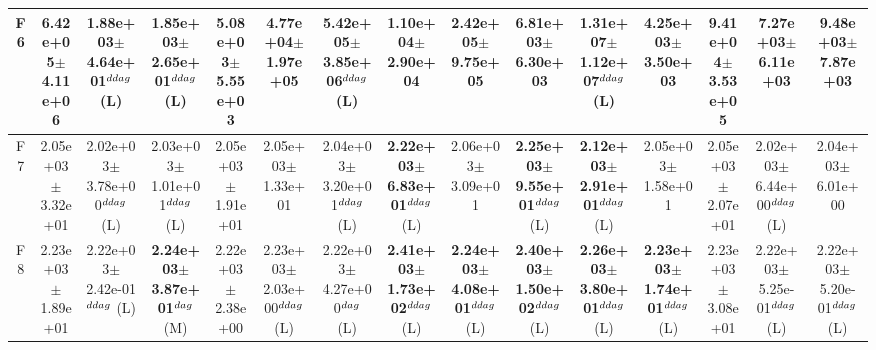 \begin{table}[!t]
\begin{tabular}{c|cccccccccccccc}
F6  & 6.42e+05$\pm$4.11e+06  & 1.88e+03$\pm$4.64e+01$^{\\ddag}$ (L)  & 1.85e+03$\pm$2.65e+01$^{\\ddag}$ (L)  & 5.08e+03$\pm$5.55e+03   & 4.77e+04$\pm$1.97e+05   & 5.42e+05$\pm$3.85e+06$^{\\ddag}$ (L)  & 1.10e+04$\pm$2.90e+04   & 2.42e+05$\pm$9.75e+05   & 6.81e+03$\pm$6.30e+03   & \textbf{1.31e+07$\pm$1.12e+07}$^{\\ddag}$ (L)  & 4.25e+03$\pm$3.50e+03   & 9.41e+04$\pm$3.53e+05   & 7.27e+03$\pm$6.11e+03   & 9.48e+03$\pm$7.87e+03  \\ \hline
F7  & 2.05e+03$\pm$3.32e+01  & 2.02e+03$\pm$3.78e+00$^{\\ddag}$ (L)  & 2.03e+03$\pm$1.01e+01$^{\\ddag}$ (L)  & 2.05e+03$\pm$1.91e+01   & 2.05e+03$\pm$1.33e+01   & 2.04e+03$\pm$3.20e+01$^{\\ddag}$ (L)  & \textbf{2.22e+03$\pm$6.83e+01}$^{\\ddag}$ (L)  & 2.06e+03$\pm$3.09e+01   & \textbf{2.25e+03$\pm$9.55e+01}$^{\\ddag}$ (L)  & \textbf{2.12e+03$\pm$2.91e+01}$^{\\ddag}$ (L)  & 2.05e+03$\pm$1.58e+01   & 2.05e+03$\pm$2.07e+01   & 2.02e+03$\pm$6.44e+00$^{\\ddag}$ (L)  & 2.04e+03$\pm$6.01e+00  \\ \hline
F8  & 2.23e+03$\pm$1.89e+01  & 2.22e+03$\pm$2.42e-01$^{\\ddag}$ (L)  & \textbf{2.24e+03$\pm$3.87e+01}$^{\\dag}$ (M)  & 2.22e+03$\pm$2.38e+00   & 2.23e+03$\pm$2.03e+00$^{\\ddag}$ (L)  & 2.22e+03$\pm$4.27e+00$^{\\dag}$ (L)  & \textbf{2.41e+03$\pm$1.73e+02}$^{\\ddag}$ (L)  & \textbf{2.24e+03$\pm$4.08e+01}$^{\\ddag}$ (L)  & \textbf{2.40e+03$\pm$1.50e+02}$^{\\ddag}$ (L)  & \textbf{2.26e+03$\pm$3.80e+01}$^{\\ddag}$ (L)  & \textbf{2.23e+03$\pm$1.74e+01}$^{\\ddag}$ (L)  & 2.23e+03$\pm$3.08e+01   & 2.22e+03$\pm$5.25e-01$^{\\ddag}$ (L)  & 2.22e+03$\pm$5.20e-01$^{\\ddag}$ (L) \\ \hline

\end{tabular}
\end{table}

